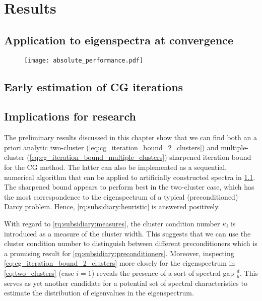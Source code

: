 \chapter{Results}\label{ch:results}

\section{Application to eigenspectra at convergence}
\begin{figure}[H]
    \centering
    \texttt{[image: absolute\_performance.pdf]}
    \caption{}
    \label{fig:cg_sharpened_bound}
\end{figure}

\section{Early estimation of CG iterations}




\section{Implications for research}\label{sec:cg_sharpened_convrate_implications}
The preliminary results discussed in this chapter show that we can find both an a priori analytic two-cluster (\cref{eq:cg_iteration_bound_2_clusters}) and multiple-cluster (\cref{eq:cg_iteration_bound_multiple_clusters}) sharpened iteration bound for the CG method. The latter can also be implemented as a sequential, numerical algorithm that can be applied to artificially constructed spectra in \cref{fig:cg_sharpened_bound}. The sharpened bound appears to perform best in the two-cluster case, which has the most correspondence to the eigenspectrum of a typical (preconditioned) Darcy problem. Hence, \ref{rq:subsidiary:heuristic} is answered positively. 

With regard to \ref{rq:subsidiary:measures}, the cluster condition number $\kappa_i$ is introduced as a measure of the cluster width. This suggests that we can use the cluster condition number to distinguish between different preconditioners which is a promising result for \ref{rq:subsidiary:preconditioners}. Moreover, inspecting \cref{eq:cg_iteration_bound_2_clusters} more closely for the eigenspectrum in \cref{eq:two_clusters} (case $i=1$) reveals the presence of a sort of spectral gap $\frac{d}{b}$. This serves as yet another candidate for a potential set of spectral characteristics to estimate the distribution of eigenvalues in the eigenspectrum.

